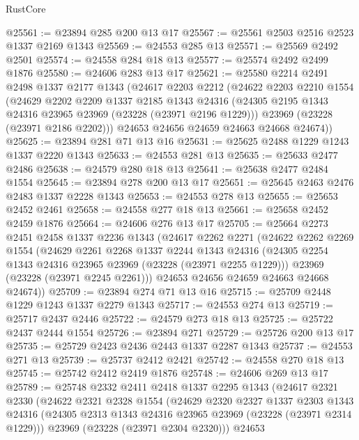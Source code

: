 \begin{lexlean}{RustCore}
\begin{coremodule}
@25561 := @23894 @285 @200 @13 @17
@25567 := @25561 @2503 @2516 @2523 @1337 @2169 @1343
@25569 := @24553 @285 @13
@25571 := @25569 @2492 @2501
@25574 := @24558 @284 @18 @13
@25577 := @25574 @2492 @2499 @1876
@25580 := @24606 @283 @13 @17
@25621 := @25580
    @2214
    @2491
    @2498
    @1337
    @2177
    @1343
    (@24617
      @2203
      @2212
      (@24622
        @2203
        @2210
        @1554
        (@24629
          @2202
          @2209
          @1337
          @2185
          @1343
          @24316
          (@24305 @2195 @1343 @24316 @23965 @23969 (@23228 (@23971 @2196 @1229)))
          @23969
          (@23228 (@23971 @2186 @2202)))
        @24653
        @24656
        @24659
        @24663
        @24668
        @24674))
@25625 := @23894 @281 @71 @13 @16
@25631 := @25625 @2488 @1229 @1243 @1337 @2220 @1343
@25633 := @24553 @281 @13
@25635 := @25633 @2477 @2486
@25638 := @24579 @280 @18 @13
@25641 := @25638 @2477 @2484 @1554
@25645 := @23894 @278 @200 @13 @17
@25651 := @25645 @2463 @2476 @2483 @1337 @2228 @1343
@25653 := @24553 @278 @13
@25655 := @25653 @2452 @2461
@25658 := @24558 @277 @18 @13
@25661 := @25658 @2452 @2459 @1876
@25664 := @24606 @276 @13 @17
@25705 := @25664
    @2273
    @2451
    @2458
    @1337
    @2236
    @1343
    (@24617
      @2262
      @2271
      (@24622
        @2262
        @2269
        @1554
        (@24629
          @2261
          @2268
          @1337
          @2244
          @1343
          @24316
          (@24305 @2254 @1343 @24316 @23965 @23969 (@23228 (@23971 @2255 @1229)))
          @23969
          (@23228 (@23971 @2245 @2261)))
        @24653
        @24656
        @24659
        @24663
        @24668
        @24674))
@25709 := @23894 @274 @71 @13 @16
@25715 := @25709 @2448 @1229 @1243 @1337 @2279 @1343
@25717 := @24553 @274 @13
@25719 := @25717 @2437 @2446
@25722 := @24579 @273 @18 @13
@25725 := @25722 @2437 @2444 @1554
@25726 := @23894 @271
@25729 := @25726 @200 @13 @17
@25735 := @25729 @2423 @2436 @2443 @1337 @2287 @1343
@25737 := @24553 @271 @13
@25739 := @25737 @2412 @2421
@25742 := @24558 @270 @18 @13
@25745 := @25742 @2412 @2419 @1876
@25748 := @24606 @269 @13 @17
@25789 := @25748
    @2332
    @2411
    @2418
    @1337
    @2295
    @1343
    (@24617
      @2321
      @2330
      (@24622
        @2321
        @2328
        @1554
        (@24629
          @2320
          @2327
          @1337
          @2303
          @1343
          @24316
          (@24305 @2313 @1343 @24316 @23965 @23969 (@23228 (@23971 @2314 @1229)))
          @23969
          (@23228 (@23971 @2304 @2320)))
        @24653

\end{coremodule}
\end{lexlean}
